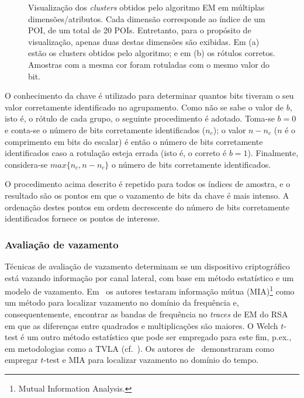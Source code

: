 \documentclass{SBCbookchapter}
\begin{document}
\begin{figure}
\begin{subfigure}[b]{0.4\textwidth}
		\caption{}
		\label{fig:clusteringCorrectLabels}
	\end{subfigure}	
	\caption{Visualização dos \emph{clusters} obtidos pelo algoritmo EM em múltiplas dimensões/atributos. Cada dimensão corresponde ao índice de um POI, de um total de 20 POIs. Entretanto, para o propósito de visualização, apenas duas destas dimensões são exibidas. Em (a) estão os clusters obtidos pelo algoritmo; e em (b) os rótulos corretos. Amostras com a mesma cor foram rotuladas com o mesmo valor do bit.}	
	\label{fig:clustering}
\end{figure}

O conhecimento da chave é utilizado para determinar quantos bits tiveram o seu valor corretamente identificado no agrupamento. Como não se sabe o valor de $b$, isto é, o rótulo de cada grupo, o seguinte procedimento é adotado. Toma-se $b=0$ e conta-se o número de bits corretamente identificados ($n_c$); o valor $n - n_c$ ($n$ é o comprimento em bits do escalar) é então o número de bits corretamente identificados caso a rotulação esteja errada (isto é, o correto é $b=1$). Finalmente, considera-se $max\{n_c, n - n_c\}$ o número de bits corretamente identificados.

O procedimento acima descrito é repetido para todos os índices de amostra, e o resultado são os pontos em que o vazamento de bits da chave é mais intenso. A ordenação destes pontos em ordem decrescente do número de bits corretamente identificados fornece os pontos de interesse.

\subsubsection{Avaliação de vazamento} %

Técnicas de avaliação de vazamento determinam se um dispositivo criptográfico está vazando informação por canal lateral, com base em método estatístico e um modelo de vazamento. 
Em~\cite{Meynard2011} os autores testaram informação mútua (MIA)\footnote{Mutual Information Analysis.} como um método para localizar vazamento no domínio da frequência e, consequentemente, encontrar as bandas de frequência no \emph{traces} de EM do RSA em que as diferenças entre quadrados e multiplicações são maiores. O Welch $t$-test é um outro método estatístico que pode ser empregado para este fim, p.ex., em metodologias como a TVLA (cf.~). Os autores de~\cite{MatherOswaldBandenburg2013} demonstraram como empregar $t$-test e MIA para localizar vazamento no domínio do tempo.
\end{document}
